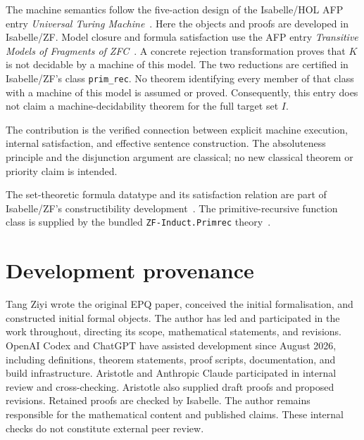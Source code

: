 \documentclass[11pt,a4paper]{article}
\begin{document}
The machine semantics follow the five-action design of the Isabelle/HOL
AFP entry \emph{Universal Turing Machine}~\cite{afp-utm}. Here the objects
and proofs are developed in Isabelle/ZF. Model closure and
formula satisfaction use the AFP entry \emph{Transitive Models of Fragments
of ZFC}~\cite{afp-models}. A concrete rejection transformation
proves that $K$ is not decidable by a machine of this model. The two reductions
are certified in Isabelle/ZF's class \texttt{prim\_rec}. No theorem identifying
every member of that class with a machine of this model is assumed or proved.
Consequently, this entry does not claim a machine-decidability theorem for
the full target set $I$.

The contribution is the verified connection between explicit machine
execution, internal satisfaction, and effective sentence construction.
The absoluteness principle and the disjunction argument are classical;
no new classical theorem or priority claim is intended.

The set-theoretic formula datatype and its satisfaction relation are part
of Isabelle/ZF's constructibility development~\cite{paulson-zf}. The
primitive-recursive function class is supplied by the bundled
\texttt{ZF-Induct.Primrec} theory~\cite{szasz}.



\clearpage
\section*{Development provenance}
Tang Ziyi wrote the original EPQ paper, conceived the initial formalisation,
and constructed initial formal objects. The author has led and
participated in the work throughout, directing its scope, mathematical
statements, and revisions. OpenAI Codex and ChatGPT have assisted development
since August 2026, including definitions, theorem statements, proof scripts,
documentation, and build infrastructure. Aristotle and Anthropic Claude
participated in internal review and cross-checking. Aristotle also supplied
draft proofs and proposed revisions. Retained proofs are checked by Isabelle.
The author remains responsible for the mathematical content and published
claims. These internal checks do not constitute external peer review.
\end{document}

